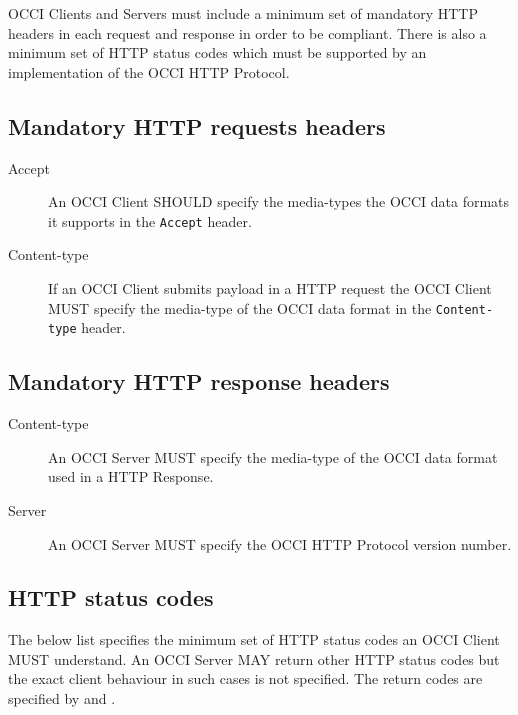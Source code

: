 \documentclass[10pt,a4paper]{article}
\begin{document}
OCCI Clients and Servers must include a minimum set of mandatory HTTP headers
in each request and response in order to be compliant.
There is also a minimum set of HTTP status codes which must be supported by
an implementation of the OCCI HTTP Protocol.

\subsection{Mandatory HTTP requests headers}

\begin{description}
\item[Accept] An OCCI Client SHOULD specify the media-types the OCCI data
formats it supports in the {\tt Accept} header.

\item[Content-type] If an OCCI Client submits payload in a HTTP request
the OCCI Client MUST specify the media-type of the OCCI data format
in the {\tt Content-type} header.
\end{description}

\subsection{Mandatory HTTP response headers}

\begin{description}
\item[Content-type] An OCCI Server MUST specify the media-type of the OCCI data
format used in a HTTP Response.
\item[Server] An OCCI Server MUST specify the OCCI HTTP Protocol version number.
\end{description}

\subsection{HTTP status codes}
The below list specifies the minimum set of HTTP status codes an OCCI Client MUST
understand. An OCCI Server MAY return other HTTP status codes but the exact client
behaviour in such cases is not specified. The return codes are specified by 
\cite{rfc7231} and \cite{rfc7235}.
\end{document}
